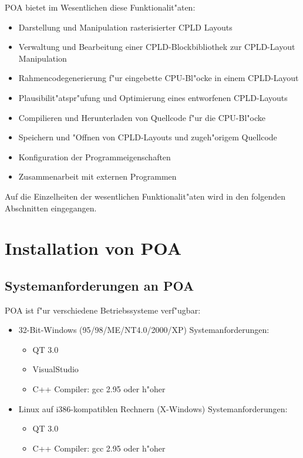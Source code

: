\documentclass[a4paper,titlepage,12pt,ngerman]{scrbook}
\begin{document}
 POA bietet im Wesentlichen diese Funktionalit"aten:
\begin{itemize}
\item Darstellung und Manipulation rasterisierter CPLD Layouts
\item Verwaltung und Bearbeitung einer CPLD-Blockbibliothek zur CPLD-Layout
      Manipulation
\item Rahmencodegenerierung f"ur eingebette CPU-Bl"ocke in einem CPLD-Layout
\item Plausibilit"atspr"ufung und Optimierung eines entworfenen CPLD-Layouts
\item Compilieren und Herunterladen von Quellcode f"ur die CPU-Bl"ocke
\item Speichern und "Offnen von CPLD-Layouts und zugeh"origem Quellcode
\item Konfiguration der Programmeigenschaften
\item Zusammenarbeit mit externen Programmen
\end{itemize}
Auf die Einzelheiten der wesentlichen Funktionalit"aten wird in den folgenden
Abschnitten eingegangen.



\chapter{Installation von POA}

\section{Systemanforderungen an POA}
POA ist f"ur verschiedene Betriebssysteme verf"ugbar:
\begin{itemize}
\item 32-Bit-Windows (95/98/ME/NT4.0/2000/XP)\newline
Systemanforderungen:
\begin{itemize}
\item QT 3.0
\item VisualStudio
\item C++ Compiler: gcc 2.95 oder h"oher
\end{itemize}

\item Linux auf i386-kompatiblen Rechnern (X-Windows) \newline
Systemanforderungen:
\begin{itemize}
\item QT 3.0
\item C++ Compiler: gcc 2.95 oder h"oher
\end{itemize}
\end{itemize}
\end{document}
